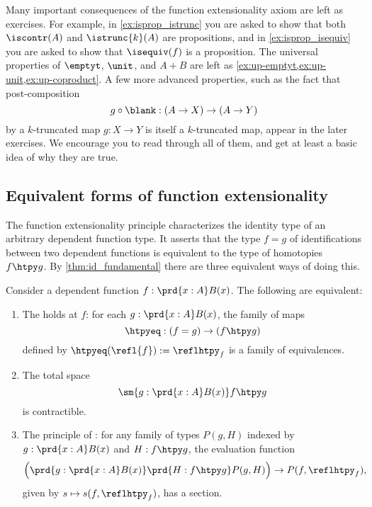 Many important consequences of the function extensionality axiom are left as exercises. For example, in \cref{ex:isprop_istrunc} you are asked to show that both $\iscontr(A)$ and $\istrunc{k}(A)$ are propositions, and in \cref{ex:isprop_isequiv} you are asked to show that $
\isequiv(f)$ is a proposition. The universal properties of $\emptyt$, $\unit$, and $A+B$ are left as \cref{ex:up-emptyt,ex:up-unit,ex:up-coproduct}. A few more advanced properties, such as the fact that post-composition
\begin{equation*}
  g\circ\blank : (A\to X)\to (A\to Y)
\end{equation*}
by a $k$-truncated map $g:X\to Y$ is itself a $k$-truncated map, appear in the later exercises. We encourage you to read through all of them, and get at least a basic idea of why they are true.


\subsection{Equivalent forms of function extensionality}

The function extensionality principle characterizes the identity type of an arbitrary dependent function type. It asserts that the type $f=g$ of identifications between two dependent functions is equivalent to the type of homotopies $f\htpy g$. By \cref{thm:id_fundamental} there are three equivalent ways of doing this.

\begin{prp}\label{prp:funext}
  Consider a dependent function $f:\prd{x:A}B(x)$. The following are equivalent:
  \begin{enumerate}
  \item The  holds at $f$: for each $g:\prd{x:A}B(x)$, the family of maps
    \begin{equation*}
      \htpyeq:(f=g)\to (f\htpy g)
    \end{equation*}
    defined by $\htpyeq(\refl{f}):=\reflhtpy_{f}$ is a family of equivalences.
  \item The total space
    \begin{equation*}
      \sm{g:\prd{x:A}B(x)}f\htpy g
    \end{equation*}
    is contractible.
  \item
    The principle of :
    for any family of types $P(g,H)$ indexed by $g:\prd{x:A}B(x)$ and $H:f\htpy g$, the evaluation function
    \begin{equation*}
      \Big(\prd{g:\prd{x:A}B(x)}\prd{H:f\htpy g}P(g,H)\Big)\to P(f,\reflhtpy_f),
    \end{equation*}
    given by $s\mapsto s(f,\reflhtpy_f)$, has a section.
  \end{enumerate}
\end{prp}

